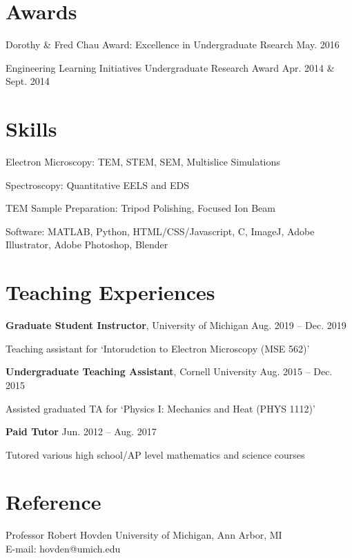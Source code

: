 \documentclass{myCV}
\begin{document}
\section*{Awards}
    \begin{entry}
        Dorothy \& Fred Chau Award: Excellence in Undergraduate Rsearch \hfill May. 2016
    \end{entry}
    \begin{entry}
        Engineering Learning Initiatives Undergraduate Research Award \hfill Apr. 2014 \& Sept. 2014
    \end{entry}
    
\section*{Skills}
    \begin{entry}
        Electron Microscopy: TEM, STEM, SEM, Multislice Simulations
    \end{entry}
    \begin{entry}
        Spectroscopy: Quantitative EELS and EDS
    \end{entry}
    \begin{entry}
        TEM Sample Preparation: Tripod Polishing, Focused Ion Beam
    \end{entry}
    \begin{entry}
        Software: MATLAB, Python, HTML/CSS/Javascript, C, ImageJ, Adobe Illustrator, Adobe Photoshop, Blender
    \end{entry}
    
\section*{Teaching Experiences}
    \begin{entry}
        \textbf{Graduate Student Instructor}, University of Michigan \hfill Aug. 2019 -- Dec. 2019\par
        \sbt{} Teaching assistant for `Intorudction to Electron Microscopy (MSE 562)'
    \end{entry}
    \begin{entry}
        \textbf{Undergraduate Teaching Assistant}, Cornell University \hfill Aug. 2015 -- Dec. 2015\par
        \sbt{} Assisted graduated TA for `Physics I: Mechanics and Heat (PHYS 1112)'
    \end{entry}
    \begin{entry}
        \textbf{Paid Tutor} \hfill Jun. 2012 -- Aug. 2017\par
        \sbt{} Tutored various high school/AP level mathematics and science courses
    \end{entry}

\section*{Reference}
    \begin{entry}
        Professor Robert Hovden \hfill University of Michigan, Ann Arbor, MI\\
        \hspace{2em} E-mail: hovden@umich.edu
    \end{entry}
\end{document}
